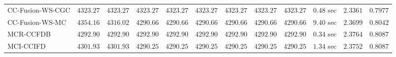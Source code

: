\begin{table}[H]
\begin{tabular}{lrrrrrrrrrrr}
    CC-Fusion-WS-CGC & $      4323.27$ & $      4323.27$ & $      4323.27$ & $      4323.27$ & $      4323.27$ & $      4323.27$ & $      4323.27$ & $      4323.27$ & $         0.48$ sec    & $       2.3361$  & $       0.7977$ \\ 
     CC-Fusion-WS-MC & $      4354.16$ & $      4316.02$ & $      4290.66$ & $      4290.66$ & $      4290.66$ & $      4290.66$ & $      4290.66$ & $      4290.66$ & $         9.40$ sec    & $       2.3699$  & $       0.8042$ \\ 
\cmidrule{1-1} 
           MCR-CCFDB & $      4292.90$ & $      4292.90$ & $      4292.90$ & $      4292.90$ & $      4292.90$ & $      4292.90$ & $      4292.90$ & $      4292.90$ & $         0.34$ sec    & $       2.3764$  & $       0.8087$ \\ 
\cmidrule{1-1} 
           MCI-CCIFD & $      4301.93$ & $      4301.93$ & $      4290.25$ & $      4290.25$ & $      4290.25$ & $      4290.25$ & $      4290.25$ & $      4290.25$ & $         1.34$ sec    & $       2.3752$  & $       0.8087$ \\ 
\bottomrule
\end{tabular}
\end{table}


